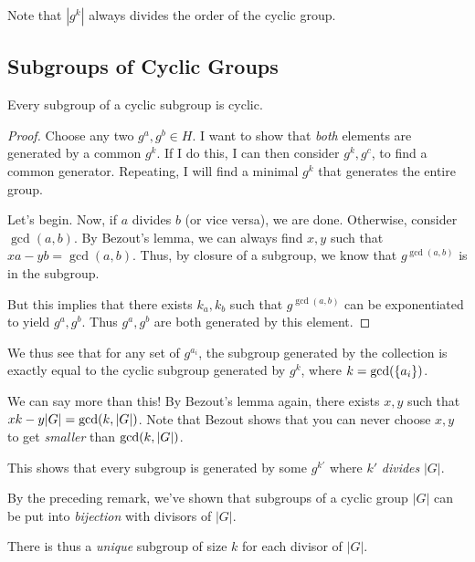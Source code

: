 \begin{remark}
  Note that $|g^k|$ always divides the order of the cyclic group.
\end{remark}

\subsection{Subgroups of Cyclic Groups}

\begin{theorem}
  Every subgroup of a cyclic subgroup is cyclic.
\end{theorem}

\begin{proof}
  Choose any two $g^a, g^b \in H$. I want to show that \emph{both}
  elements are generated by a common $g^k$. If I do this, I can then
  consider $g^k, g^c$, to find a common generator. Repeating, I will
  find a minimal $g^k$ that generates the entire group.

  Let's begin. Now, if $a$ divides $b$ (or vice versa), we are done.
  Otherwise, consider $\gcd(a, b)$. By Bezout's lemma, we can always
  find $x, y$ such that $xa - yb = \gcd(a, b)$. Thus, by closure of a
  subgroup, we know that $g^{\gcd(a, b)}$ is in the subgroup.

  But this implies that there exists $k_a, k_b$ such that $g^{\gcd(a,
  b)}$ can be exponentiated to yield $g^a, g^b$. Thus $g^a, g^b$ are
  both generated by this element.
\end{proof}

\begin{remark}
  We thus see that for any set of $g^{a_i}$, the subgroup generated by
  the collection is exactly equal to the cyclic subgroup generated by
  $g^k$, where $k = \gcd\mathopen{}\left( {\left\{ a_i \right\}} \right)\mathclose{}$.
\end{remark}

\begin{remark}
  We can say more than this! By Bezout's lemma again, there exists $x,
  y$ such that $xk - y|G| = \gcd\mathopen{}\left( {k, |G|} \right)\mathclose{}$. Note that Bezout shows
  that you can never choose $x, y$ to get \emph{smaller} than
  $\gcd\mathopen{}\left( {k, |G|} \right)\mathclose{}$.

  This shows that every subgroup is generated by some $g^{k'}$ where
  $k'$ \emph{divides} $|G|$.
\end{remark}

\begin{theorem}
  By the preceding remark, we've shown that subgroups of a cyclic group
  $|G|$ can be put into \emph{bijection} with divisors of $|G|$.

  There is thus a \emph{unique} subgroup of size $k$ for each divisor of
  $|G|$.
\end{theorem}

